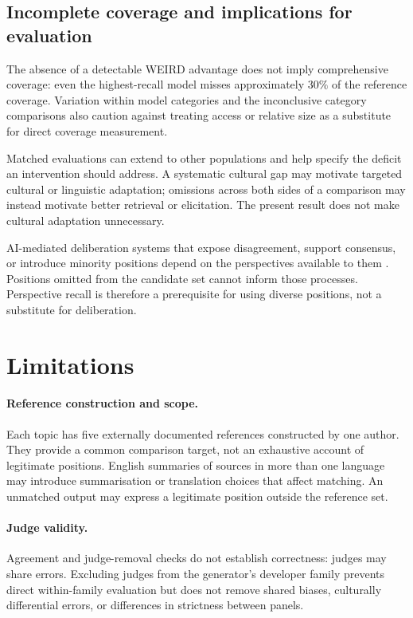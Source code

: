 \documentclass[11pt,a4paper]{article}
\begin{document}
\subsection{Incomplete coverage and implications for evaluation}
\label{sec:Incomplete coverage remains the main problem}
\label{sec:Implications for evaluation and culturally adaptive systems}
The absence of a detectable WEIRD advantage does not imply comprehensive coverage: even the highest-recall model misses approximately $30\%$ of the reference coverage. Variation within model categories and the inconclusive category comparisons also caution against treating access or relative size as a substitute for direct coverage measurement.

Matched evaluations can extend to other populations and help specify the deficit an intervention should address. A systematic cultural gap may motivate targeted cultural or linguistic adaptation; omissions across both sides of a comparison may instead motivate better retrieval or elicitation. The present result does not make cultural adaptation unnecessary.

AI-mediated deliberation systems that expose disagreement, support consensus, or introduce minority positions depend on the perspectives available to them \cite{tesslerAICanHelp2024a,chiangEnhancingAIAssistedGroup2024b,leeAmplifyingMinorityVoices2025a}. Positions omitted from the candidate set cannot inform those processes. Perspective recall is therefore a prerequisite for using diverse positions, not a substitute for deliberation.

\section{Limitations}
\label{sec:Limitations}
\paragraph{Reference construction and scope.}
Each topic has five externally documented references constructed by one author. They provide a common comparison target, not an exhaustive account of legitimate positions. English summaries of sources in more than one language may introduce summarisation or translation choices that affect matching. An unmatched output may express a legitimate position outside the reference set.

\paragraph{Judge validity.}
Agreement and judge-removal checks do not establish correctness: judges may share errors. Excluding judges from the generator's developer family prevents direct within-family evaluation but does not remove shared biases, culturally differential errors, or differences in strictness between panels.
\end{document}
